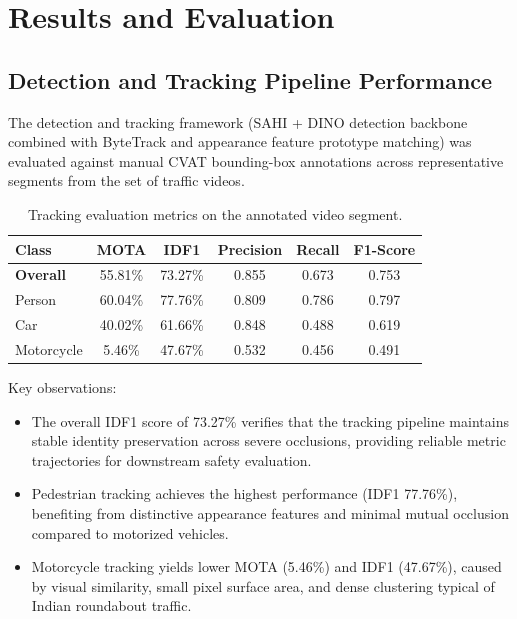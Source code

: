 \chapter{Results and Evaluation}
\label{chap:results}

\section{Detection and Tracking Pipeline Performance}

The detection and tracking framework (SAHI + DINO detection backbone combined with ByteTrack and appearance feature prototype matching) was evaluated against manual CVAT bounding-box annotations across representative segments from the set of traffic videos.

\begin{table}[H]
\centering
\caption{Tracking evaluation metrics on the annotated video segment.}
\label{tab:tracking_metrics}
\begin{tabular}{lccccc}
\toprule
\textbf{Class} & \textbf{MOTA} & \textbf{IDF1} & \textbf{Precision} & \textbf{Recall} & \textbf{F1-Score} \\
\midrule
\textbf{Overall} & 55.81\% & 73.27\% & 0.855 & 0.673 & 0.753 \\
Person           & 60.04\% & 77.76\% & 0.809 & 0.786 & 0.797 \\
Car              & 40.02\% & 61.66\% & 0.848 & 0.488 & 0.619 \\
Motorcycle       &  5.46\% & 47.67\% & 0.532 & 0.456 & 0.491 \\
\bottomrule
\end{tabular}
\end{table}

Key observations:
\begin{itemize}
    \item The overall IDF1 score of 73.27\% verifies that the tracking pipeline maintains stable identity preservation across severe occlusions, providing reliable metric trajectories for downstream safety evaluation.
    \item Pedestrian tracking achieves the highest performance (IDF1 77.76\%), benefiting from distinctive appearance features and minimal mutual occlusion compared to motorized vehicles.
    \item Motorcycle tracking yields lower MOTA (5.46\%) and IDF1 (47.67\%), caused by visual similarity, small pixel surface area, and dense clustering typical of Indian roundabout traffic.
\end{itemize}


